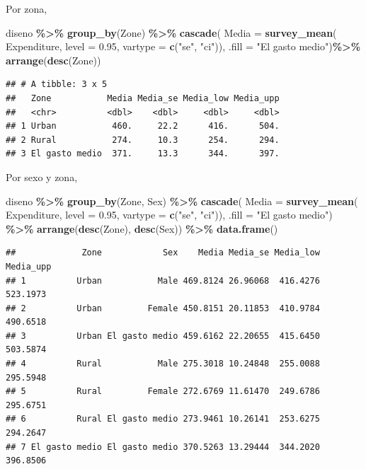 \documentclass[
  12pt,
]{book}
\newenvironment{Shaded}{\begin{snugshade}}{\end{snugshade}}
\newcommand{\AttributeTok}[1]{\textcolor[rgb]{0.13,0.29,0.53}{#1}}
\newcommand{\FloatTok}[1]{\textcolor[rgb]{0.00,0.00,0.81}{#1}}
\newcommand{\FunctionTok}[1]{\textcolor[rgb]{0.13,0.29,0.53}{\textbf{#1}}}
\newcommand{\NormalTok}[1]{#1}
\newcommand{\SpecialCharTok}[1]{\textcolor[rgb]{0.81,0.36,0.00}{\textbf{#1}}}
\newcommand{\StringTok}[1]{\textcolor[rgb]{0.31,0.60,0.02}{#1}}
\begin{document}
Por zona,

\begin{Shaded}
\begin{Highlighting}[]
\NormalTok{diseno }\SpecialCharTok{\%\textgreater{}\%} \FunctionTok{group\_by}\NormalTok{(Zone) }\SpecialCharTok{\%\textgreater{}\%}
  \FunctionTok{cascade}\NormalTok{(}
    \AttributeTok{Media =} \FunctionTok{survey\_mean}\NormalTok{(}
\NormalTok{      Expenditure, }\AttributeTok{level =} \FloatTok{0.95}\NormalTok{,}
       \AttributeTok{vartype =}  \FunctionTok{c}\NormalTok{(}\StringTok{"se"}\NormalTok{, }\StringTok{"ci"}\NormalTok{)),}
        \AttributeTok{.fill =} \StringTok{"El gasto medio"}\NormalTok{)}\SpecialCharTok{\%\textgreater{}\%}
  \FunctionTok{arrange}\NormalTok{(}\FunctionTok{desc}\NormalTok{(Zone))}
\end{Highlighting}
\end{Shaded}

\begin{verbatim}
## # A tibble: 3 x 5
##   Zone           Media Media_se Media_low Media_upp
##   <chr>          <dbl>    <dbl>     <dbl>     <dbl>
## 1 Urban           460.     22.2      416.      504.
## 2 Rural           274.     10.3      254.      294.
## 3 El gasto medio  371.     13.3      344.      397.
\end{verbatim}

Por sexo y zona,

\begin{Shaded}
\begin{Highlighting}[]
\NormalTok{diseno }\SpecialCharTok{\%\textgreater{}\%} \FunctionTok{group\_by}\NormalTok{(Zone, Sex) }\SpecialCharTok{\%\textgreater{}\%}
  \FunctionTok{cascade}\NormalTok{(}
    \AttributeTok{Media =} \FunctionTok{survey\_mean}\NormalTok{(}
\NormalTok{      Expenditure, }\AttributeTok{level =} \FloatTok{0.95}\NormalTok{,}
       \AttributeTok{vartype =}  \FunctionTok{c}\NormalTok{(}\StringTok{"se"}\NormalTok{, }\StringTok{"ci"}\NormalTok{)),}
        \AttributeTok{.fill =} \StringTok{"El gasto medio"}\NormalTok{) }\SpecialCharTok{\%\textgreater{}\%}
  \FunctionTok{arrange}\NormalTok{(}\FunctionTok{desc}\NormalTok{(Zone), }\FunctionTok{desc}\NormalTok{(Sex)) }\SpecialCharTok{\%\textgreater{}\%}
  \FunctionTok{data.frame}\NormalTok{()}
\end{Highlighting}
\end{Shaded}

\begin{verbatim}
##             Zone            Sex    Media Media_se Media_low Media_upp
## 1          Urban           Male 469.8124 26.96068  416.4276  523.1973
## 2          Urban         Female 450.8151 20.11853  410.9784  490.6518
## 3          Urban El gasto medio 459.6162 22.20655  415.6450  503.5874
## 4          Rural           Male 275.3018 10.24848  255.0088  295.5948
## 5          Rural         Female 272.6769 11.61470  249.6786  295.6751
## 6          Rural El gasto medio 273.9461 10.26141  253.6275  294.2647
## 7 El gasto medio El gasto medio 370.5263 13.29444  344.2020  396.8506
\end{verbatim}
\end{document}
